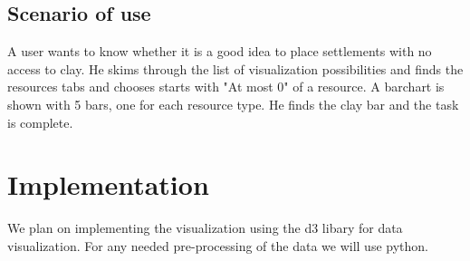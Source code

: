 \documentclass{article}
\begin{document}
\subsection{Scenario of use}

A user wants to know whether it is a good idea to place settlements with no
access to clay. He skims through the list of visualization possibilities
and finds the resources tabs and chooses starts with "At most 0" of a
resource. A barchart is shown with 5 bars, one for each resource type. He
finds the clay bar and the task is complete.

\section{Implementation}
We plan on implementing the visualization using the d3 libary for data visualization.
For any needed pre-processing of the data we will use python.
\end{document}

